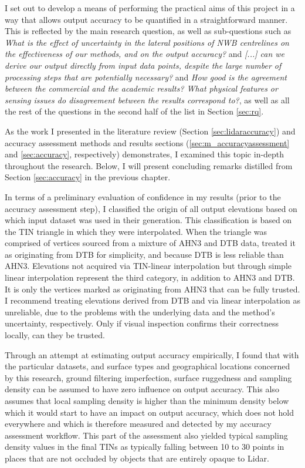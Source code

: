 I set out to develop a means of performing the practical aims of this project in a way that allows output accuracy to be quantified in a straightforward manner. This is reflected by the main research question, as well as sub-questions such as \textit{What is the effect of uncertainty in the lateral positions of NWB centrelines on the effectiveness of our methods, and on the output accuracy?} and \textit{[...] can we derive our output directly from input data points, despite the large number of processing steps that are potentially necessary?} and \textit{How good is the agreement between the commercial and the academic results? What physical features or sensing issues do disagreement between the results correspond to?}, as well as all the rest of the questions in the second half of the list in Section \ref{sec:rq}.

As the work I presented in the literature review (Section \ref{sec:lidaraccuracy}) and accuracy assessment methods and results sections (\ref{sec:m_accuracyassessment} and \ref{sec:accuracy}, respectively) demonstrates, I examined this topic in-depth throughout the research. Below, I will present concluding remarks distilled from Section \ref{sec:accuracy} in the previous chapter.

In terms of a preliminary evaluation of confidence in my results (prior to the accuracy assessment step), I classified the origin of all output elevations based on which input dataset was used in their generation. This classification is based on the TIN triangle in which they were interpolated. When the triangle was comprised of vertices sourced from a mixture of AHN3 and DTB data, treated it as originating from DTB for simplicity, and because DTB is less reliable than AHN3. Elevations not acquired via TIN-linear interpolation but through simple linear interpolation represent the third category, in addition to AHN3 and DTB. It is only the vertices marked as originating from AHN3 that can be fully trusted. I recommend treating elevations derived from DTB and via linear interpolation as unreliable, due to the problems with the underlying data and the method's uncertainty, respectively. Only if visual inspection confirms their correctness locally, can they be trusted.

Through an attempt at estimating output accuracy empirically, I found that with the particular datasets, and surface types and geographical locations concerned by this research, ground filtering imperfection, surface ruggedness and sampling density can be assumed to have zero influence on output accuracy. This also assumes that local sampling density is higher than the minimum density below which it would start to have an impact on output accuracy, which does not hold everywhere and which is therefore measured and detected by my accuracy assessment workflow. This part of the assessment also yielded typical sampling density values in the final TINs as typically falling between 10 to 30 points in places that are not occluded by objects that are entirely opaque to Lidar.

